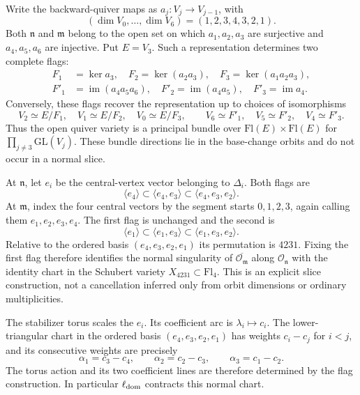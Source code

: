 \documentclass[11pt]{amsart}
\theoremstyle{definition}
\theoremstyle{remark}
\begin{document}
Write the backward-quiver maps as $a_j:V_j\to V_{j-1}$, with
\[
 (\dim V_0,\ldots,\dim V_6)=(1,2,3,4,3,2,1).
\]
Both $\mathfrak n$ and $\mathfrak m$ belong to the open set on which
$a_1,a_2,a_3$ are surjective and $a_4,a_5,a_6$ are injective.
Put $E=V_3$.  Such a representation determines two complete flags:
\[
 \begin{split}
 F_1&=\ker a_3,\quad
 F_2=\ker(a_2a_3),\quad
 F_3=\ker(a_1a_2a_3),\\
 F'_1&=\operatorname{im}(a_4a_5a_6),\quad
 F'_2=\operatorname{im}(a_4a_5),\quad
 F'_3=\operatorname{im}a_4.
 \end{split}
\]
Conversely, these flags recover the representation up to choices of
isomorphisms
\[
 V_2\simeq E/F_1,\quad V_1\simeq E/F_2,\quad V_0\simeq E/F_3,
 \qquad
 V_6\simeq F'_1,\quad V_5\simeq F'_2,\quad V_4\simeq F'_3.
\]
Thus the open quiver variety is a principal bundle over
$\mathrm{Fl}(E)\times\mathrm{Fl}(E)$ for
$\prod_{j\ne3}\mathrm{GL}(V_j)$.  These bundle directions lie in the
base-change orbits and do not occur in a normal slice.

At $\mathfrak n$, let $e_i$ be the central-vertex vector belonging to
$\Delta_i$.  Both flags are
\[
 \langle e_4\rangle
 \subset\langle e_4,e_3\rangle
 \subset\langle e_4,e_3,e_2\rangle.
\]
At $\mathfrak m$, index the four central vectors by the segment starts
$0,1,2,3$, again calling them $e_1,e_2,e_3,e_4$.
The first flag is unchanged and the second is
\[
 \langle e_1\rangle
 \subset\langle e_1,e_3\rangle
 \subset\langle e_1,e_3,e_2\rangle.
\]
Relative to the ordered basis $(e_4,e_3,e_2,e_1)$ its permutation is
$4231$.  Fixing the first flag therefore identifies the normal
singularity of $\overline{\mathcal O_{\mathfrak m}}$ along
$\mathcal O_{\mathfrak n}$ with the identity chart in the Schubert
variety $X_{4231}\subset\mathrm{Fl}_4$.
This is an explicit slice construction, not a cancellation inferred
only from orbit dimensions or ordinary multiplicities.

The stabilizer torus scales the $e_i$.  Its coefficient arc is
$\lambda_i\mapsto c_i$.  The lower-triangular chart in the ordered
basis $(e_4,e_3,e_2,e_1)$ has weights
$c_i-c_j$ for $i<j$, and its consecutive weights are precisely
\[
 \alpha_1=c_3-c_4,\qquad
 \alpha_2=c_2-c_3,\qquad
 \alpha_3=c_1-c_2.
\]
The torus action and its two coefficient lines are therefore determined
by the flag construction.  In particular $\ell_{\rm dom}$ contracts
this normal chart.
\end{document}
